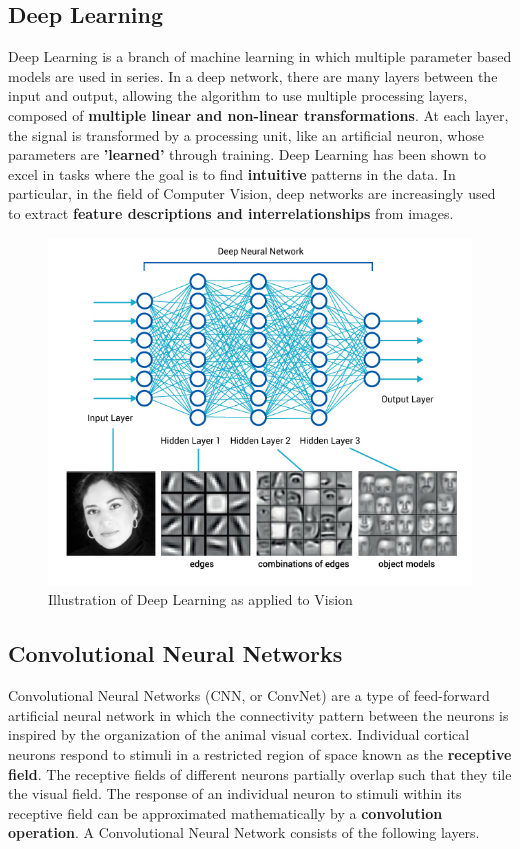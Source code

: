 \documentclass{article}
\begin{document}
			\subsection{Deep Learning}
				Deep Learning is a branch of machine learning in which multiple parameter based models are used in series. In a deep network, there are many layers between the input and output, allowing the algorithm to use multiple processing layers, composed of \textbf{multiple linear and non-linear transformations}. At each layer, the signal is transformed by a processing unit, like an artificial neuron, whose parameters are \textbf{'learned'} through training. Deep Learning has been shown to excel in tasks where the goal is to find \textbf{intuitive} patterns in the data. In particular, in the field of Computer Vision, deep networks are increasingly used to extract \textbf{feature descriptions and interrelationships} from images.
				\begin{figure}[ht!]
					\includegraphics[width=14cm]{blog_deeplearning3.jpg}
					\caption{Illustration of Deep Learning as applied to Vision\label{fig2}}
				\end{figure}	
			\subsection{Convolutional Neural Networks}
			Convolutional Neural Networks (CNN, or ConvNet) are a type of feed-forward artificial neural network in which the connectivity pattern between the neurons is inspired by the organization of the animal visual cortex. Individual cortical neurons respond to stimuli in a restricted region of space known as the \textbf{receptive field}. The receptive fields of different neurons partially overlap such that they tile the visual field. The response of an individual neuron to stimuli within its receptive field can be approximated mathematically by a \textbf{convolution operation}. A Convolutional Neural Network consists of the following layers.
				
\end{document}
